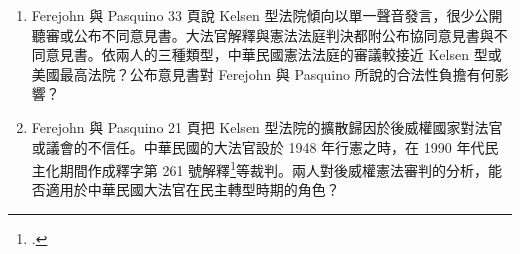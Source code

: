 \begin{enumerate}
\item
  Ferejohn 與 Pasquino 33 頁說 Kelsen 型法院傾向以單一聲音發言，很少公開聽審或公布不同意見書。大法官解釋與憲法法庭判決都附公布協同意見書與不同意見書。依兩人的三種類型，中華民國憲法法庭的審議較接近 Kelsen 型或美國最高法院？公布意見書對 Ferejohn 與 Pasquino 所說的合法性負擔有何影響？
\item
  Ferejohn 與 Pasquino 21 頁把 Kelsen 型法院的擴散歸因於後威權國家對法官或議會的不信任。中華民國的大法官設於 1948 年行憲之時，在 1990 年代民主化期間作成釋字第 261 號解釋\footcite{jy261}等裁判。兩人對後威權憲法審判的分析，能否適用於中華民國大法官在民主轉型時期的角色？
\end{enumerate}
